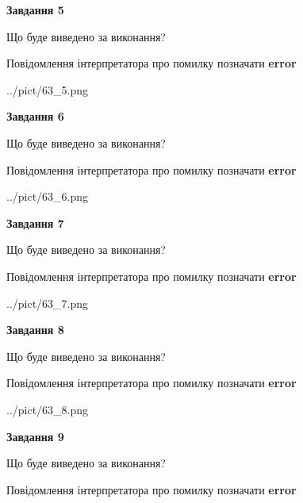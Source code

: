 \documentclass[11pt, ukrainian]{article}
\begin{document}
{\begin {large}
{\begin {center}\textbf{Завдання 5}\end {center}}\par
Що буде виведено за виконання? \par
Повідомлення інтерпретатора про помилку позначати \textbf{error}

\begin{center}
	{../pict/63_5.png}
\end{center}
\newpage

{\begin {center}\textbf{Завдання 6}\end {center}}\par
Що буде виведено за виконання? \par
Повідомлення інтерпретатора про помилку позначати \textbf{error}

\begin{center}
	{../pict/63_6.png}
\end{center}
\newpage

{\begin {center}\textbf{Завдання 7}\end {center}}\par
Що буде виведено за виконання? \par
Повідомлення інтерпретатора про помилку позначати \textbf{error}

\begin{center}
	{../pict/63_7.png}
\end{center}
\newpage

{\begin {center}\textbf{Завдання 8}\end {center}}\par
Що буде виведено за виконання? \par
Повідомлення інтерпретатора про помилку позначати \textbf{error}

\begin{center}
	{../pict/63_8.png}
\end{center}
\newpage

{\begin {center}\textbf{Завдання 9}\end {center}}\par
Що буде виведено за виконання? \par
Повідомлення інтерпретатора про помилку позначати \textbf{error}


\end{large}}
\end{document}
